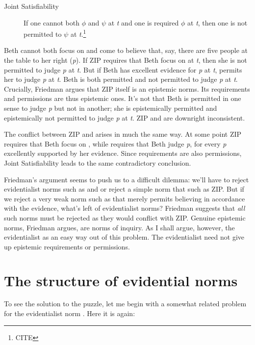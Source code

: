 \documentclass[12pt]{article}
\begin{document}
\newcommand{\opic}{Joint Satisfiability}
\begin{description}
    \item[\opic{}] If one cannot both $\phi$ and $\psi$ at \textit{t} and one is required $\phi$ at \textit{t}, then one is not permitted to $\psi$ at \textit{t}.\footnote{CITE}
\end{description}
%
Beth cannot both focus on  and come to believe that, say, there are five people at the table to her right (\textit{p}). If ZIP requires that Beth focus on  at \textit{t}, then she is not permitted to judge \textit{p} at \textit{t}. But if Beth has excellent evidence for \textit{p} at \textit{t}, \ep{} permits her to judge \textit{p} at \textit{t}. Beth is both permitted and not permitted to judge \textit{p} at \textit{t}. Crucially, Friedman argues that ZIP itself is an epistemic norms. Its requirements and permissions are thus epistemic ones. It's not that Beth is permitted in one sense to judge \textit{p} but not in another; she is epistemically permitted and epistemically not permitted to judge \textit{p} at \textit{t}. ZIP and \ep{} are downright inconsistent.

The conflict between ZIP and \eo{} arises in much the same way. At some point ZIP requires that Beth focus on , while \eo{} requires that Beth judge \textit{p}, for every \textit{p} excellently supported by her evidence. Since requirements are also permissions, \opic{} leads to the same contradictory conclusion.

Friedman's argument seems to push us to a difficult dilemma: we'll have to reject evidentialist norms such as \ep{} and \eo{} or reject a simple norm that such as ZIP. But if we reject a very weak norm such as \ep{} that merely permits believing in accordance with the evidence, what's left of evidentialist norms? Friedman suggests that \textit{all} such norms must be rejected as they would conflict with ZIP. Genuine epistemic norms, Friedman argues, are norms of inquiry. As I shall argue, however, the evidentialist as an easy way out of this problem. The evidentialist need not give up epistemic requirements or permissions.

\section{The structure of evidential norms}\label{sec:struct}

To see the solution to the puzzle, let me begin with a somewhat related problem for the evidentialist norm \eo{}. Here it is again:
\end{document}
